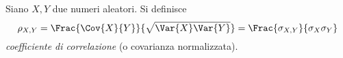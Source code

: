 \documentclass{subfiles}
\begin{document}
Siano $X, Y$ due numeri aleatori. Si definisce
$$
    \rho_{X,Y} = \Frac{\Cov{X}{Y}}{\sqrt{\Var{X}\Var{Y}}} = \Frac{\sigma_{X,Y}}{\sigma_{X}\sigma_{Y}}
$$
\emph{coefficiente di correlazione} (o covarianza normalizzata).
\end{document}
